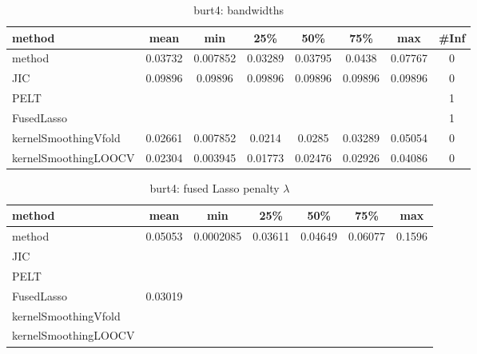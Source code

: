\begin{table}[ht]
\centering
\begin{tabular}{l|c|ccccc|c}
  \hline
method & mean & min & 25\% & 50\% & 75\% & max & \#Inf \\ 
  \hline
method & 0.03732 & 0.007852 & 0.03289 & 0.03795 & 0.0438 & 0.07767 &   0 \\ 
  JIC & 0.09896 & 0.09896 & 0.09896 & 0.09896 & 0.09896 & 0.09896 &   0 \\ 
  PELT &  &  &  &  &  &  &   1 \\ 
  FusedLasso &  &  &  &  &  &  &   1 \\ 
  kernelSmoothingVfold & 0.02661 & 0.007852 & 0.0214 & 0.0285 & 0.03289 & 0.05054 &   0 \\ 
  kernelSmoothingLOOCV & 0.02304 & 0.003945 & 0.01773 & 0.02476 & 0.02926 & 0.04086 &   0 \\ 
   \hline
\end{tabular}
\caption{burt4: bandwidths} 
\label{tab:burt4Bandwidths}
\end{table}
\begin{table}[ht]
\centering
\begin{tabular}{l|c|ccccc}
  \hline
method & mean & min & 25\% & 50\% & 75\% & max \\ 
  \hline
method & 0.05053 & 0.0002085 & 0.03611 & 0.04649 & 0.06077 & 0.1596 \\ 
  JIC &  &  &  &  &  &  \\ 
  PELT &  &  &  &  &  &  \\ 
  FusedLasso & 0.03019 &  &  &  &  &  \\ 
  kernelSmoothingVfold &  &  &  &  &  &  \\ 
  kernelSmoothingLOOCV &  &  &  &  &  &  \\ 
   \hline
\end{tabular}
\caption{burt4: fused Lasso penalty $\lambda$} 
\label{tab:burt4Lambdas}
\end{table}
